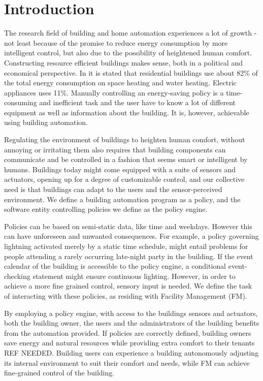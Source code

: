 \section{Introduction} \label{sec:introduction}
The research field of building and home automation experiences a lot of growth - not least because of the promise to reduce energy consumption by more intelligent control, but also due to the possibility of heightened human comfort. Constructing resource efficient buildings makes sense, both in a political and economical perspective. In \cite{janssen2004towards} it is stated that residential buildings use about 82\% of the total energy consumption on space heating and water heating. Electric appliances uses 11\%. Manually controlling an energy-saving policy is
a time-consuming and inefficient task and the user have to know a lot of different equipment as well as information about the building. It is, however, achievable using building automation. 

Regulating the environment of buildings to heighten human comfort, without annoying or irritating them \cite{futurehome} also requires that building components can communicate and be controlled in a fashion that seems smart or intelligent by humans. Buildings today might come equipped with a suite of sensors and actuators, opening up for a degree of customizable control, and our collective need is that buildings can adapt to the users and the sensor-perceived environment. We define a building automation program as a policy, and the software entity controlling policies we define as the policy engine.

Policies can be based on semi-static data, like time and weekdays. However this can have unforeseen and unwanted consequences. For example, a policy governing lightning activated merely by a static time schedule, might entail problems for people attending a rarely occurring late-night party in the building. If the event calendar of the building is accessible to the policy engine, a conditional event-checking statement might ensure continuous lighting. However, in order to achieve a more fine grained control, sensory input is needed. We define the task of interacting with these policies, as residing with Facility Management (FM). 

By employing a policy engine, with access to the buildings sensors and actuators, both the building owner, the users and the administrators of the building benefits from the automation provided. If policies are correctly defined, building owners save energy and natural resources while providing extra comfort to their tenants REF NEEDED. Building users can experience a building autonomously adjusting its internal environment to suit their comfort and needs, while FM can achieve fine-grained control of the building.

